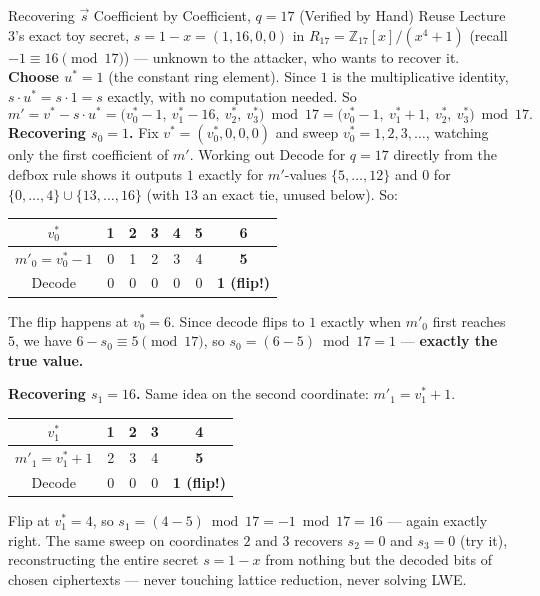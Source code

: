 \begin{exbox}{Recovering $\vec s$ Coefficient by Coefficient, $q=17$ (Verified by Hand)}
Reuse Lecture 3's exact toy secret, $s = 1-x = (1,16,0,0)$ in $R_{17}=\mathbb{Z}_{17}[x]/(x^4+1)$ (recall $-1\equiv16\pmod{17}$) --- unknown to the attacker, who wants to recover it. \textbf{Choose $u^*=1$} (the constant ring element). Since $1$ is the multiplicative identity, $s\cdot u^* = s\cdot 1 = s$ exactly, with no computation needed. So
$$
m' = v^* - s\cdot u^* = \big(v^*_0-1,\ v^*_1-16,\ v^*_2,\ v^*_3\big) \bmod 17 = \big(v^*_0-1,\ v^*_1+1,\ v^*_2,\ v^*_3\big) \bmod 17.
$$
\textbf{Recovering $s_0=1$.} Fix $v^*=(v_0^*,0,0,0)$ and sweep $v_0^*=1,2,3,\ldots$, watching only the first coefficient of $m'$. Working out $\text{Decode}$ for $q=17$ directly from the defbox rule shows it outputs $1$ exactly for $m'$-values $\{5,\ldots,12\}$ and $0$ for $\{0,\ldots,4\}\cup\{13,\ldots,16\}$ (with $13$ an exact tie, unused below). So:
\begin{center}
\begin{tabular}{c|c|c|c|c|c|c}
$v_0^*$ & 1 & 2 & 3 & 4 & 5 & \textbf{6} \\
\hline
$m'_0 = v_0^*-1$ & 0 & 1 & 2 & 3 & 4 & \textbf{5} \\
\hline
Decode & 0 & 0 & 0 & 0 & 0 & \textbf{1 (flip!)}
\end{tabular}
\end{center}
The flip happens at $v_0^*=6$. Since decode flips to $1$ exactly when $m'_0$ first reaches $5$, we have $6 - s_0 \equiv 5\pmod{17}$, so $s_0 = (6-5)\bmod 17 = 1$ --- \textbf{exactly the true value.}

\textbf{Recovering $s_1=16$.} Same idea on the second coordinate: $m'_1 = v_1^*+1$.
\begin{center}
\begin{tabular}{c|c|c|c|c}
$v_1^*$ & 1 & 2 & 3 & \textbf{4} \\
\hline
$m'_1=v_1^*+1$ & 2 & 3 & 4 & \textbf{5} \\
\hline
Decode & 0 & 0 & 0 & \textbf{1 (flip!)}
\end{tabular}
\end{center}
Flip at $v_1^*=4$, so $s_1 = (4-5)\bmod 17 = -1 \bmod 17 = 16$ --- again exactly right. The same sweep on coordinates $2$ and $3$ recovers $s_2=0$ and $s_3=0$ (try it), reconstructing the entire secret $s=1-x$ from nothing but the decoded bits of chosen ciphertexts --- never touching lattice reduction, never solving LWE.
\end{exbox}


